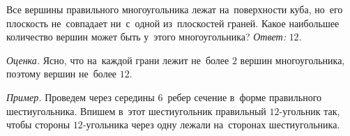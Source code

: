 \problem
Все вершины правильного многоугольника лежат на~поверхности куба, но~его
плоскость не~совпадает ни~с~одной из~плоскостей граней.
Какое наибольшее количество вершин может быть у~этого многоугольника?
\solution
\emph{Ответ:} $12$.
\par
\emph{Оценка.}
Ясно, что на~каждой грани лежит не~более $2$ вершин многоугольника, поэтому
вершин не~более $12$.
\par
\emph{Пример.}
Проведем через середины $6$~ребер сечение в~форме правильного шестиугольника.
Впишем в~этот шестиугольник правильный $12$-угольник так, чтобы стороны
$12$-угольника через одну лежали на~сторонах шестиугольника.
\endproblem
